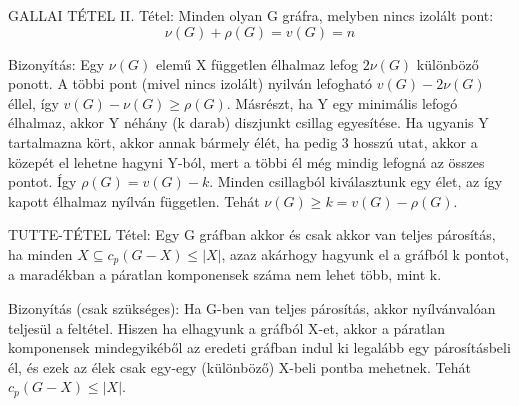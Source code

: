 \documentclass[]{article}
\begin{document}
\begin{framed}
GALLAI TÉTEL II. Tétel: Minden olyan G gráfra, melyben nincs izolált pont:
$$\nu(G) + \rho(G) = v(G) = n$$
\end{framed}
\begin{leftbar}
Bizonyítás: Egy $\nu(G)$ elemű X független élhalmaz lefog $2\nu(G)$ különböző ponott. A többi pont (mivel nincs izolált) nyilván lefogható $v(G) - 2\nu(G)$ éllel, így $v(G) - \nu(G) \geq \rho(G)$. Másrészt, ha Y egy minimális lefogó élhalmaz, akkor Y néhány (k darab) diszjunkt csillag egyesítése. Ha ugyanis Y tartalmazna kört, akkor annak bármely élét, ha pedig 3 hosszú utat, akkor a közepét el lehetne hagyni Y-ból, mert a többi él még mindig lefogná az összes pontot. Így $\rho(G) = v(G) - k$. Minden csillagból kiválasztunk egy élet, az így kapott élhalmaz nyílván független. Tehát $\nu(G) \geq k = v(G) - \rho(G)$.
\end{leftbar}
\begin{framed}
TUTTE-TÉTEL Tétel: Egy G gráfban akkor és csak akkor van teljes párosítás, ha minden $X \subseteq c_p(G - X)\leq |X|$, azaz akárhogy hagyunk el a gráfból k pontot, a maradékban a páratlan komponensek száma nem lehet több, mint k. 
\end{framed}
\begin{leftbar}
Bizonyítás (csak szükséges): Ha G-ben van teljes párosítás, akkor nyílvánvalóan teljesül a feltétel. Hiszen ha elhagyunk a gráfból X-et, akkor a páratlan komponensek mindegyikéből az eredeti gráfban indul ki legalább egy párosításbeli él, és ezek az élek csak egy-egy (különböző) X-beli pontba mehetnek. Tehát $c_p(G - X) \leq |X|$.
\end{leftbar}
\end{document}
